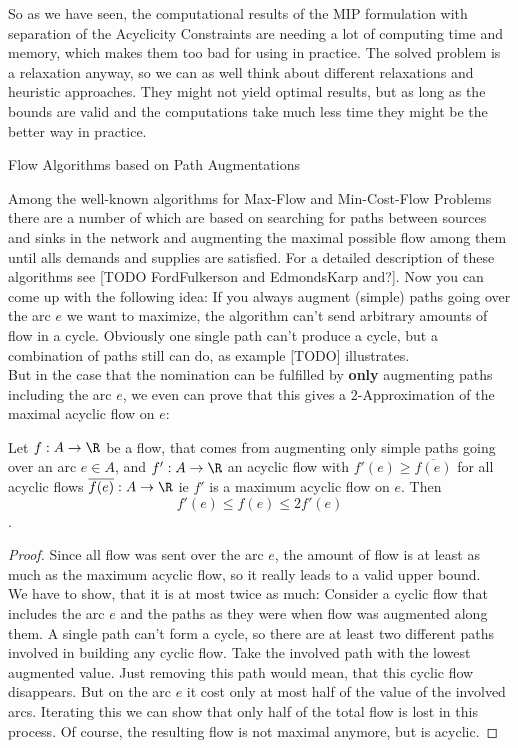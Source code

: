 So as we have seen, the computational results of the MIP formulation with separation of the Acyclicity Constraints 
are needing a lot of computing time and memory, which makes them too bad for using in practice. The solved problem is a 
relaxation anyway, so we can as well think about different relaxations and heuristic approaches. They might not yield 
optimal results, but as long as the bounds are valid and the computations take much less time they might be the better 
way in practice.

\caption{Flow Algorithms based on Path Augmentations}

Among the well-known algorithms for Max-Flow and Min-Cost-Flow Problems there are a number of which are based on 
searching for paths between sources and sinks in the network and augmenting the maximal possible flow among them until 
alls demands and supplies are satisfied. For a detailed description of these algorithms see [TODO FordFulkerson and 
EdmondsKarp and?]. 
Now you can come up with the following idea: If you always augment (simple) paths going over the arc $e$ we want to 
maximize, the algorithm can't send arbitrary amounts of flow in a cycle. Obviously one single path can't produce a 
cycle, but a combination of paths still can do, as example [TODO] illustrates. \\

But in the case that the nomination can be fulfilled by \textbf{only} augmenting paths including the arc $e$, we even 
can prove that this gives a $2$-Approximation of the maximal acyclic flow on $e$:

\begin{prop}
 Let $f: A\to \R$ be a flow, that comes from augmenting only simple paths going over an arc $e\in A$, and $f':A\to \R$ 
an acyclic flow with $f'(e)\ge \overline{f(e)}$ for all acyclic flows $\overline{f(e)}:A\to \R$ ie $f'$ is a maximum 
acyclic flow on $e$. Then $$ f'(e)\le f(e)\le 2f'(e)$$.
\end{prop}

\begin{proof}
 Since all flow was sent over the arc $e$, the amount of flow is at least as much as the maximum acyclic flow, so it 
really leads to a valid upper bound.\\
We have to show, that it is at most twice as much: Consider a cyclic flow that includes the arc $e$ and the paths as 
they were when flow was augmented along them. A single path can't form a cycle, so there are at least two different 
paths involved in building any cyclic flow. Take the involved path with the lowest augmented value. Just removing this 
path would mean, that this cyclic flow disappears. But on the arc $e$ it cost only at most half of the value of the 
involved arcs. Iterating this we can show that only half of the total flow is lost in this process. Of course, the 
resulting flow is not maximal anymore, but is acyclic.
\end{proof}

